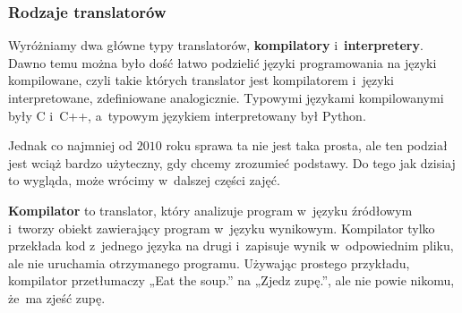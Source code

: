 \documentclass[10pt,t]{beamer}
\begin{document}




\begin{frame}
  \frametitle{Rodzaje translatorów}

  \vspace{-0.75em}


  Wyróżniamy dwa główne typy translatorów, \textbf{kompilatory}
  i~\textbf{interpretery}. Dawno temu można było dość łatwo podzielić
  języki programowania na języki kompilowane, czyli takie których translator
  jest kompilatorem i~języki interpretowane, zdefiniowane analogicznie.
  Typowymi językami kompilowanymi \alert{były} C i~C++, a~typowym językiem
  interpretowany \alert{był} Python.

  Jednak co najmniej od $2010$ roku sprawa ta nie jest taka prosta, ale ten
  podział jest wciąż bardzo użyteczny, gdy chcemy zrozumieć podstawy. Do
  tego jak dzisiaj to wygląda, może wrócimy w~dalszej części zajęć.

  \textbf{Kompilator} to translator, który analizuje program w~języku
  źródłowym i~tworzy obiekt zawierający program w~języku wynikowym.
  Kompilator \alert{tylko} przekłada kod z~jednego języka na drugi
  i~zapisuje wynik w~odpowiednim pliku, ale \alert{nie} uruchamia
  otrzymanego programu. Używając prostego przykładu, kompilator
  przetłumaczy „Eat the soup.” na „Zjedz zupę.”, ale nie powie nikomu,
  że~ma zjeść zupę.

\end{frame}
\end{document}
